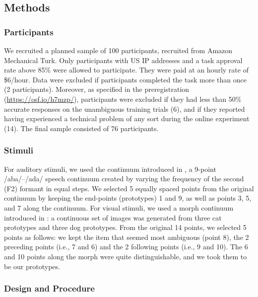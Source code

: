 \documentclass[10pt,letterpaper]{article}
\begin{document}
\subsection{Methods}

\subsubsection{Participants}

We recruited a planned sample of 100 participants, recruited from Amazon Mechanical Turk. Only participants with US IP addresses and a task approval rate above 85\% were allowed to participate. They were paid at an hourly rate of \$6/hour. Data were excluded if participants completed the task more than
once (2 participants). Moreover, as specified in the preregistration (\url{https://osf.io/h7mzp/}), participants were excluded if they had less than 50\% accurate responses on the unambiguous training trials (6), and if they reported having experienced a technical problem of any sort during the online experiment (14). The final sample consisted of 76 participants.

\subsubsection{Stimuli}

For  auditory stimuli, we used the continuum introduced in , a 9-point /aba/--/ada/ speech continuum created by varying the frequency of the second (F2) formant in equal steps. We selected 5 equally spaced points from the original continuum by keeping the end-points (prototypes) 1 and 9, as well as points 3, 5, and 7 along the continuum. For visual stimuli, we used a morph continuum introduced in : a continuous set of images was generated from three cat prototypes and three dog prototypes. From the original 14 points, we selected 5 points as follows: we kept the item that seemed most ambiguous (point 8), the 2 preceding points (i.e., 7 and 6) and the 2 following points (i.e., 9 and 10). The 6 and 10 points along the morph were quite distinguishable, and we took them to be our prototypes.

%

\subsubsection{Design and Procedure}
\end{document}
